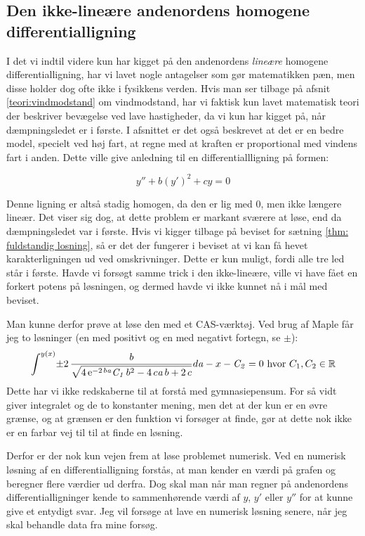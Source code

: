 \subsection{Den ikke-lineære andenordens homogene differentialligning}
\label{teori: Den ikke-linear andenordens ligning}
I det vi indtil videre kun har kigget på den andenordens \textit{lineære} homogene differentialligning, har vi lavet nogle antagelser som gør matematikken pæn, men disse holder dog ofte ikke i fysikkens verden.
Hvis man ser tilbage på afsnit \ref{teori:vindmodstand} om vindmodstand, har vi faktisk kun lavet matematisk teori der beskriver bevægelse ved lave hastigheder, da vi kun har kigget på, når dæmpningsledet er i første. 
I afsnittet er det også beskrevet at det er en bedre model, specielt ved høj fart, at regne med at kraften er proportional med vindens fart i anden.
Dette ville give anledning til en differentiallligning på formen:

$$y'' + b(y')^2 + cy = 0$$

Denne ligning er altså stadig homogen, da den er lig med $0$, men ikke længere lineær. 
Det viser sig dog, at dette problem er markant sværere at løse, end da dæmpningsledet var i første. 
Hvis vi kigger tilbage på beviset for sætning \ref{thm: fuldstandig losning}, så er det der fungerer i beviset at vi kan få hevet karakterligningen ud ved omskrivninger. 
Dette er kun muligt, fordi alle tre led står i første. 
Havde vi forsøgt samme trick i den ikke-lineære, ville vi have fået en forkert potens på løsningen, og dermed havde vi ikke kunnet nå i mål med beviset. 

Man kunne derfor prøve at løse den med et CAS-værktøj. 
Ved brug af Maple får jeg to løsninger (en med positivt og en med negativt fortegn, se $\pm$):
$$\int ^{y \left( x \right) }\!\pm 2\,{\frac {b}{\sqrt {4\,{{\rm e}^{-2\,b{
\it a}}}{\it C_1}\,{b}^{2}-4\,c{\it a}\,b+2\,c}}}{d{\it a}}-x-{
\it C_2}=0 \text{ hvor } C_1,C_2 \in \mathbb{R}
$$
Dette har vi ikke redskaberne til at forstå med gymnasiepensum. 
For så vidt giver integralet og de to konstanter mening, men det at der kun er en øvre grænse, og at grænsen er den funktion vi forsøger at finde, gør at dette nok ikke er en farbar vej til til at finde en løsning. 

Derfor er der nok kun vejen frem at løse problemet numerisk. 
Ved en numerisk løsning af en differentialligning forstås, at man kender en værdi på grafen og beregner flere værdier ud derfra.
Dog skal man når man regner på andenordens differentialligninger kende to sammenhørende værdi af $y$, $y'$ eller $y''$ for at kunne give et entydigt svar.
Jeg vil forsøge at lave en numerisk løsning senere, når jeg skal behandle data fra mine forsøg. 
